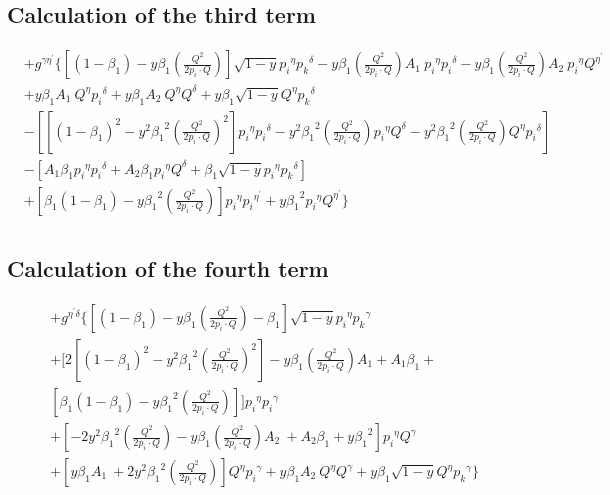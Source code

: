 \subsection*{Calculation of the third term}
\begin{equation}
\begin{split} 
&+g^{{{\gamma}}{{\eta}^{\prime}}}\lbrace [(1-\beta_1)-y\beta_1 (\frac{Q^2}{2p_i \cdot Q})] \sqrt{1-y}{p_i}^{{\eta}}{{p_k}^{{\delta}}}-y {\beta_1} (\frac{Q^2}{2p_i \cdot Q}) A_1 \:{p_i}^{{\eta}}{p_i}^{{\delta}}
-y {\beta_1} (\frac{Q^2}{2p_i \cdot Q}) A_2\: {p_i}^{{\eta}}{Q}^{{\eta}^{\prime}}\\
&+y {\beta_1} A_1 \:{Q}^{{\eta}}{p_i}^{{\delta}}+y {\beta_1} A_2 \:{Q}^{{\eta}}{Q}^{{\delta}}+y {\beta_1}\sqrt{1-y}{Q}^{{\eta}}{{p_k}^{{\delta}}}\\
&-[[(1-\beta_1)^2-y^2 {\beta_1}^2 (\frac{Q^2}{2p_i \cdot Q})^2] {p_i}^{{\eta}}{p_i}^{{\delta}}-y^2 {\beta_1}^2 (\frac{Q^2}{2p_i \cdot Q}){p_i}^{{\eta}}{Q}^{{\delta}}-y^2 {\beta_1}^2 (\frac{Q^2}{2p_i \cdot Q}){Q}^{{\eta}}{p_i}^{{\delta}}]\\
&-[A_1\beta_1 {p_i}^{{\eta}}{{p_i}^{{\delta}}}+A_2\beta_1 {p_i}^{{\eta}}{{Q}^{{\delta}}}+\beta_1 \sqrt{1-y}{p_i}^{{\eta}}{{p_k}^{{\delta}}}]\\
&+[\beta_1(1-\beta_1)-y {\beta_1}^2 (\frac{Q^2}{2p_i \cdot Q})] {p_i}^{{\eta}}{p_i}^{{\eta}^{\prime}}+y {\beta_1}^2 {p_i}^{{\eta}}{Q}^{{\eta}^{\prime}}\rbrace\\
\end{split}
\end{equation}

\subsection*{Calculation of the fourth term}

\begin{equation}
\begin{split} 
&+g^{{{\eta}^{\prime}}{{\delta}}}\lbrace [(1-\beta_1)-y\beta_1 (\frac{Q^2}{2p_i \cdot Q})-\beta_1] \sqrt{1-y}{p_i}^{{\eta}}{{p_k}^{{\gamma}}}\\
&+[2[(1-\beta_1)^2-y^2 {\beta_1}^2 (\frac{Q^2}{2p_i \cdot Q})^2]-y {\beta_1} (\frac{Q^2}{2p_i \cdot Q}) A_1 +A_1\beta_1 +\\
&[\beta_1(1-\beta_1)-y {\beta_1}^2 (\frac{Q^2}{2p_i \cdot Q})]] {p_i}^{{\eta}}{p_i}^{{\gamma}}\\
& +[-2y^2 {\beta_1}^2 (\frac{Q^2}{2p_i \cdot Q})-y {\beta_1} (\frac{Q^2}{2p_i \cdot Q}) A_2\:+A_2\beta_1 +y {\beta_1}^2] {p_i}^{{\eta}}{Q}^{{\gamma}}\\
&+[y {\beta_1} A_1 \:+2y^2 {\beta_1}^2 (\frac{Q^2}{2p_i \cdot Q})]{Q}^{{\eta}}{p_i}^{{\gamma}}+y {\beta_1} A_2 \:{Q}^{{\eta}}{Q}^{{\gamma}}+y {\beta_1}\sqrt{1-y}{Q}^{{\eta}}{{p_k}^{{\gamma}}}
\rbrace\\
\end{split}
\end{equation}

